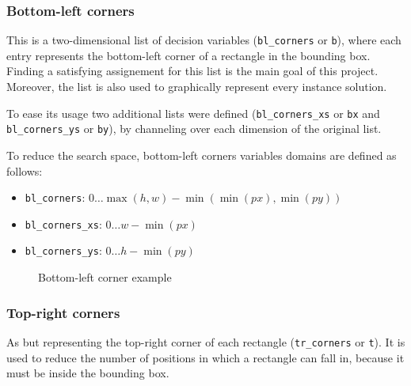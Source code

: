 \documentclass[a4paper,10pt]{article}
\begin{document}
\subsubsection*{Bottom-left corners} \label{sec:bottom-left-corners}
This is a two-dimensional list of decision variables (\texttt{bl\_corners} or \texttt{b}), where each entry represents the bottom-left corner of a rectangle in the bounding box. Finding a satisfying assignement for this list is the main goal of this project. Moreover, the list is also used to graphically represent every instance solution.

To ease its usage two additional lists were defined (\texttt{bl\_corners\_xs} or \texttt{bx} and \texttt{bl\_corners\_ys} or \texttt{by}), by channeling over each dimension of the original list.

To reduce the search space, bottom-left corners variables domains are defined as follows:
\begin{itemize}
   \item \texttt{bl\_corners}: $0 \dots \max({h, w}) - \min({\min({px}), \min({py})})$
   \item \texttt{bl\_corners\_xs}: $0 \dots w - \min({px})$
   \item \texttt{bl\_corners\_ys}: $0 \dots h - \min({py})$
\end{itemize}

\begin{figure}[h]
   \centering
   \caption{Bottom-left corner example}
\end{figure}

\subsubsection*{Top-right corners} \label{sec:top-right-corners}
As  but representing the top-right corner of each rectangle (\texttt{tr\_corners} or \texttt{t}). It is used to reduce the number of positions in which a rectangle can fall in, because it must be inside the bounding box.
\end{document}
